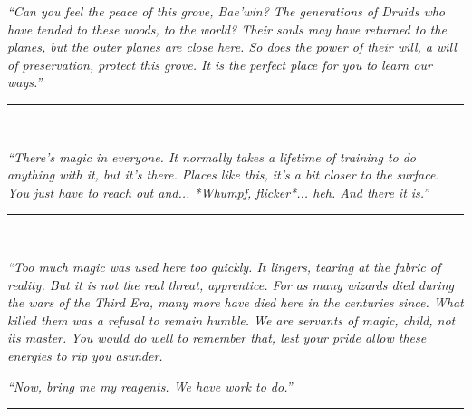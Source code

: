 \documentclass{article}
\begin{document}


{\it ``Can you feel the peace of this grove, Bae'win?  The generations of Druids who have tended to these woods, to the world?  Their souls may have returned to the planes, but the outer planes are close here.  So does the power of their will, a will of preservation, protect this grove.  It is the perfect place for you to learn our ways.''}

\smallskip

\hrule
\ 

\smallskip

{\it ``There's magic in everyone.  It normally takes a lifetime of training to do anything with it, but it's there.  Places like this, it's a bit closer to the surface.  You just have to reach out and... *Whumpf, flicker*... heh.  And there it is.''}

\smallskip

\hrule
\ 

\smallskip

{\it ``Too much magic was used here too quickly.  It lingers, tearing at the fabric of reality.  But it is not the real threat, apprentice.  For as many wizards died during the wars of the Third Era, many more have died here in the centuries since.  What killed them was a refusal to remain humble.  We are servants of magic, child, not its master.  You would do well to remember that, lest your pride allow these energies to rip you asunder.}

{\it ``Now, bring me my reagents.  We have work to do.''}

\smallskip

\hrule
\ 

\bigskip
\end{document}
